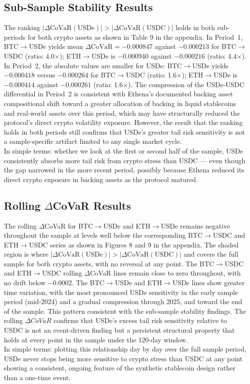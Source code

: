 \documentclass[12pt,a4paper,titlepage,oneside,english]{article}
\begin{document}
\subsection{Sub-Sample Stability Results}
The ranking $|\Delta\text{CoVaR}(\text{USDe})| > |\Delta\text{CoVaR}(\text{USDC})|$
holds in both sub-periods for both crypto assets as shown in Table 9 in the appendix. In Period~1, BTC$\to$USDe
yields mean $\Delta\text{CoVaR} = -0.000847$ against $-0.000213$ for
BTC$\to$USDC (ratio: 4.0$\times$); ETH$\to$USDe is $-0.000940$ against
$-0.000216$ (ratio: 4.4$\times$). In Period~2, the absolute values
are smaller for USDe: BTC$\to$USDe yields $-0.000418$ versus $-0.000264$
for BTC$\to$USDC (ratio: 1.6$\times$); ETH$\to$USDe is $-0.000414$ against
$-0.000261$ (ratio: 1.6$\times$). The
compression of the USDe-USDC differential in Period~2 is consistent with
Ethena's documented backing asset compositional shift toward a greater allocation of backing in liquid stablecoins and real-world assets over this period, which may have
structurally reduced the protocol's direct crypto volatility exposure. However, the
result that the ranking holds in both periods still confirms that
USDe's greater tail risk sensitivity is not a sample-specific artifact limited
to any single market cycle.\\
In simple terms: whether we look at the first or second half of the sample,
USDe consistently absorbs more tail risk from crypto stress than USDC —
even though the gap narrowed in the more recent period, possibly because
Ethena reduced its direct crypto exposure in backing assets as the protocol matured.

\subsection{Rolling $\Delta$CoVaR Results}
The rolling $\Delta$CoVaR for BTC$\to$USDe and ETH$\to$USDe remains negative throughout the sample at levels well below the
corresponding BTC$\to$USDC and ETH$\to$USDC series as shown in Figures 8 and 9 in the appendix. The shaded region is where
$|\Delta\text{CoVaR}(\text{USDe})| > |\Delta\text{CoVaR}(\text{USDC})|$ and
covers the full sample for both crypto assets, with no reversal at any point.
The BTC$\to$USDC and ETH$\to$USDC rolling $\Delta$CoVaR lines remain close
to zero throughout, with no drift below $-0.0002$. The
BTC$\to$USDe and ETH$\to$USDe lines show greater time variation, with the most pronounced USDe sensitivity in the early
sample period (mid-2024) and a gradual compression through 2025, and toward the end of the sample. This pattern consistent with the
sub-sample stability findings. The rolling $\Delta{CoVaR}$ confirms that USDe's
excess tail risk sensitivity relative to USDC is not an event-driven finding but a persistent structural property that holds at
every point in the sample under the 120-day window.\\
In simple terms: plotting this relationship day by day over the full sample
period, USDe never stops being more sensitive to crypto stress than USDC at
any point showing a consistent, ongoing feature of the synthetic stablecoin
design rather than a one-time event.
\end{document}
